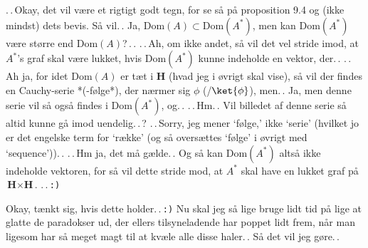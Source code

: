 \documentclass{report}
\begin{document}
.\,.\,Okay, det vil være et rigtigt godt tegn, for se så på proposition 9.4 og (ikke mindst) dets bevis. Så vil.\,. Ja, $\mathrm{Dom}(A) \subset \mathrm{Dom}(A^*)$, men kan $\mathrm{Dom}(A^*)$ være større end $\mathrm{Dom}(A)$?\,.\,. .\,.\,Ah, om ikke andet, så vil det vel stride imod, at $A^*$'s graf skal være lukket, hvis $\mathrm{Dom}(A^*)$ kunne indeholde en vektor, der.\,. .\,.\,Ah ja, for idet $\mathrm{Dom}(A)$ er tæt i \textbf{H} (hvad jeg i øvrigt skal vise), så vil der findes en Cauchy-serie *(-følge*), der nærmer sig $\phi$ (/$\ket{\phi}$), men.\,. Ja, men denne serie vil så også findes i $\mathrm{Dom}(A^*)$, og.\,. .\,.\,Hm.\,. Vil billedet af denne serie så altid kunne gå imod uendelig.\,.\,? .\,.\,Sorry, jeg mener `følge,' ikke `serie' (hvilket jo er det engelske term for `række' (og så oversættes `følge' i øvrigt med `sequence')).\,. .\,.\,Hm ja, det må gælde.\,. Og så kan $\mathrm{Dom}(A^*)$ altså ikke indeholde vektoren, for så vil dette stride mod, at $A^*$ skal have en lukket graf på $\mathrm{\textbf{H}} \times \mathrm{\textbf{H}}$. .\,.\,\texttt:\texttt)  

Okay, tænkt sig, hvis dette holder.\,.\,\texttt{:)} Nu skal jeg så lige bruge lidt tid på lige at glatte de paradokser ud, der ellers tilsyneladende har poppet lidt frem, når man ligesom har så meget magt til at kvæle alle disse haler.\,. Så det vil jeg gøre.\,.
\end{document}
